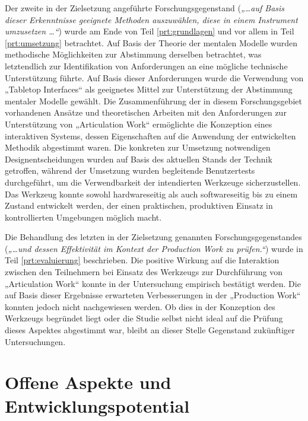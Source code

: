 Der zweite in der Zielsetzung angeführte Forschungsgegenstand (\emph{„\ldots auf Basis dieser Erkenntnisse geeignete Methoden auszuwählen, diese in einem Instrument umzusetzen \ldots“}) wurde am Ende von Teil \ref{prt:grundlagen} und vor allem in Teil \ref{prt:umsetzung} betrachtet. Auf Basis der Theorie der mentalen Modelle wurden methodische Möglichkeiten zur Abstimmung derselben betrachtet, was letztendlich zur Identifikation von Anforderungen an eine mögliche technische Unterstützung führte. Auf Basis dieser Anforderungen wurde die Verwendung von „Tabletop Interfaces“ als geeignetes Mittel zur Unterstützung der Abstimmung mentaler Modelle gewählt. Die Zusammenführung der in diesem Forschungsgebiet vorhandenen Ansätze und theoretischen Arbeiten mit den Anforderungen zur Unterstützung von „Articulation Work“ ermöglichte die Konzeption eines interaktiven Systems, dessen Eigenschaften auf die Anwendung der entwickelten Methodik abgestimmt waren. Die konkreten zur Umsetzung notwendigen Designentscheidungen wurden auf Basis des aktuellen Stands der Technik getroffen, während der Umsetzung wurden begleitende Benutzertests durchgeführt, um die Verwendbarkeit der intendierten Werkzeuge sicherzustellen. Das Werkzeug konnte sowohl hardwareseitig als auch softwareseitig bis zu einem Zustand entwickelt werden, der einen praktischen, produktiven Einsatz in kontrollierten Umgebungen möglich macht.

Die Behandlung des letzten in der Zielsetzung genannten Forschungsgegenstandes (\emph{„\ldots und dessen Effektivität im Kontext der Production Work zu prüfen.“}) wurde in Teil \ref{prt:evaluierung} beschrieben. Die positive Wirkung auf die Interaktion zwischen den Teilnehmern bei Einsatz des Werkzeugs zur Durchführung von „Articulation Work“ konnte in der Untersuchung empirisch bestätigt werden. Die auf Basis dieser Ergebnisse erwarteten Verbesserungen in der „Production Work“ konnten jedoch nicht nachgewiesen werden. Ob dies in der Konzeption des Werkzeugs begründet liegt oder die Studie selbst nicht ideal auf die Prüfung dieses Aspektes abgestimmt war, bleibt an dieser Stelle Gegenstand zukünftiger Untersuchungen.


\section{Offene Aspekte und Entwicklungspotential}
\label{sec:offene_aspekte_und_entwicklungspotential}

